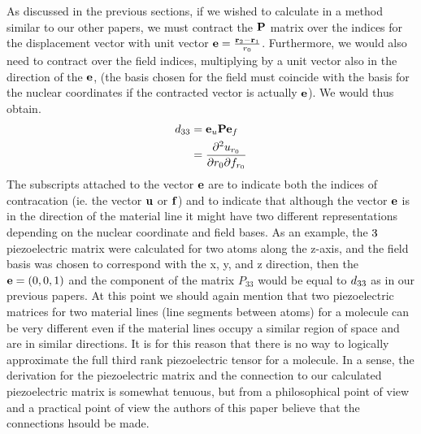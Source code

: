 As discussed in the previous sections, if we wished to calculate \dtt in a method similar to our other papers, we must contract the ${\bf{P}}$ matrix 
over the indices for the displacement vector with unit vector ${\bf{e}} = \frac{{\bf{r}}_2- {\bf{r}}_1}{r_0}$.  
Furthermore, we would also need to contract over 
the field indices, multiplying by a unit vector also in the direction of the ${\bf{e}}$, (the basis chosen for the field must coincide with the basis for the 
nuclear coordinates if the contracted vector is actually ${\bf{e}}$).
We would thus obtain.
\begin{equation}
\begin{split}
 {\ensuremath{d_{33}}} &= {\bf{e}}_u{\bf{P}}{\bf{e}}_f \\
 &=\frac{\partial^2 u_{r_0}}{\partial r_{0} \partial f_{r_0}}
\end{split}
\end{equation}
The subscripts attached to the vector ${\bf{e}}$ are to indicate both the indices of contracation (ie. the vector ${\bf{u}}$ or ${\bf{f}}$) and to indicate that 
although the vector ${\bf{e}}$ is in the direction of the material line it might have two different representations depending on the nuclear coordinate
and field bases.
As an example, the $3\time3$ piezoelectric matrix were calculated for two atoms along the z-axis, and the field basis was chosen to correspond with the x,
y, and z direction, then the ${\bf{e}}=(0,0,1)$ and the component of the matrix $P_33$ would be equal to ${d_{33}}$ as in our previous papers.  
At this point we should again mention that two piezoelectric matrices for two material lines (line segments between atoms) for a molecule can be 
very different even if the material lines occupy a similar region of space and are in similar directions.
It is for this reason that there is no way to logically approximate the full third rank piezoelectric tensor for a molecule.  
In a sense, the derivation for the piezoelectric matrix and the connection to our calculated piezoelectric matrix is somewhat tenuous, but from 
a philosophical point of view and a practical point of view the authors of this paper believe that the connections hsould be made.  

